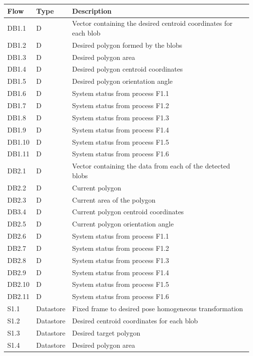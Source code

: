 \begin{table}[!htb]
	\centering
	\begin{tabular}{lll}
		\toprule
		Flow & Type & Description \\
		\midrule
		DB1.1 & D & Vector containing the desired centroid coordinates for each blob\\
		DB1.2 & D & Desired polygon formed by the blobs \\
		DB1.3 & D & Desired polygon area \\
		DB1.4 & D & Desired polygon centroid coordinates\\
		DB1.5 & D & Desired polygon orientation angle \\
		DB1.6 & D & System status from process F1.1 \\
		DB1.7 & D & System status from process F1.2 \\
		DB1.8 & D & System status from process F1.3 \\
		DB1.9 & D & System status from process F1.4 \\
		DB1.10 & D & System status from process F1.5 \\
		DB1.11 & D & System status from process F1.6 \\
		\midrule
		DB2.1 & D & Vector containing the data from each of the detected blobs \\
		DB2.2 & D & Current polygon \\
		DB2.3 & D & Current area of the polygon \\
		DB3.4 & D & Current polygon centroid coordinates \\
		DB2.5 & D & Current polygon orientation angle \\
		DB2.6 & D & System status from process F1.1 \\
		DB2.7 & D & System status from process F1.2 \\
		DB2.8 & D & System status from process F1.3 \\
		DB2.9 & D & System status from process F1.4 \\
		DB2.10 & D & System status from process F1.5 \\
		DB2.11 & D & System status from process F1.6 \\
		\midrule
		S1.1 & Datastore & Fixed frame to desired pose homogeneous transformation \\
		S1.2 & Datastore & Desired centroid coordinates for each blob \\
		S1.3 & Datastore & Desired target polygon \\
		S1.4 & Datastore & Desired polygon area \\

\end{tabular}
\end{table}
